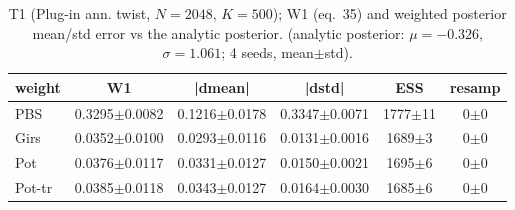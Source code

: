 \begin{table}[ht]
\centering
\caption{T1 (Plug-in ann. twist, $N=2048$, $K=500$); W1 (eq.~35) and weighted posterior mean/std error vs the analytic posterior. (analytic posterior: $\mu=-0.326$, $\sigma=1.061$; 4 seeds, mean$\pm$std).}
\label{tab:toy_t1_plug_in_annealed}
\begin{tabular}{lccccc}
\toprule
weight & W1 & |dmean| & |dstd| & ESS & resamp \\
\midrule
PBS & 0.3295$\pm$0.0082 & 0.1216$\pm$0.0178 & 0.3347$\pm$0.0071 & 1777$\pm$11 & 0$\pm$0 \\
Girs & 0.0352$\pm$0.0100 & 0.0293$\pm$0.0116 & 0.0131$\pm$0.0016 & 1689$\pm$3 & 0$\pm$0 \\
Pot & 0.0376$\pm$0.0117 & 0.0331$\pm$0.0127 & 0.0150$\pm$0.0021 & 1695$\pm$6 & 0$\pm$0 \\
Pot-tr & 0.0385$\pm$0.0118 & 0.0343$\pm$0.0127 & 0.0164$\pm$0.0030 & 1685$\pm$6 & 0$\pm$0 \\
\bottomrule
\end{tabular}
\end{table}
